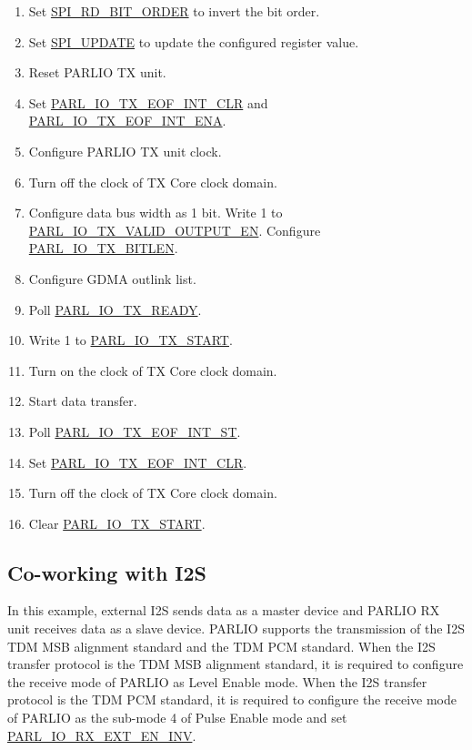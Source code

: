 \documentclass[main\_\_EN.tex]{subfiles}
\begin{document}
\begin{itemize}
\begin{enumerate}
        \item Set \hyperref[fielddesc:SPIRDBITORDER]{SPI\_RD\_BIT\_ORDER} to invert the bit order.
        \item Set \hyperref[fielddesc:SPIUPDATE]{SPI\_UPDATE} to update the configured register value.
        \item Reset PARLIO TX unit.
        \item Set \hyperref[fielddesc:PARLIOTXEOFINTCLR]{PARL\_IO\_TX\_EOF\_INT\_CLR} and \hyperref[fielddesc:PARLIOTXEOFINTENA]{PARL\_IO\_TX\_EOF\_INT\_ENA}.
        \item Configure PARLIO TX unit clock.
        \item Turn off the clock of TX Core clock domain.
        \item Configure data bus width as 1 bit. Write 1 to \hyperref[fielddesc:PARLIOTXVALIDOUTPUTEN]{PARL\_IO\_TX\_VALID\_OUTPUT\_EN}. Configure \hyperref[fielddesc:PARLIOTXBITLEN]{PARL\_IO\_TX\_BITLEN}.
        \item Configure GDMA outlink list.
        \item Poll \hyperref[fielddesc:PARLIOTXREADY]{PARL\_IO\_TX\_READY}.
        \item Write 1 to \hyperref[fielddesc:PARLIOTXSTART]{PARL\_IO\_TX\_START}.
        \item Turn on the clock of TX Core clock domain.
        \item Start data transfer.
        \item Poll \hyperref[fielddesc:PARLIOTXEOFINTST]{PARL\_IO\_TX\_EOF\_INT\_ST}.
        \item Set \hyperref[fielddesc:PARLIOTXEOFINTCLR]{PARL\_IO\_TX\_EOF\_INT\_CLR}.
        \item Turn off the clock of TX Core clock domain.
        \item Clear \hyperref[fielddesc:PARLIOTXSTART]{PARL\_IO\_TX\_START}.
    \end{enumerate}
\end{itemize}

\subsection{Co-working with I2S}

In this example, external I2S sends data as a master device and PARLIO RX unit receives data as a slave device. PARLIO supports the transmission of the I2S TDM MSB alignment standard and the TDM PCM standard. When the I2S transfer protocol is the TDM MSB alignment standard, it is required to configure the receive mode of PARLIO as Level Enable mode. When the I2S transfer protocol is the TDM PCM standard, it is required to configure the receive mode of PARLIO as the sub-mode 4 of Pulse Enable mode and set \hyperref[fielddesc:PARLIORXEXTENINV]{PARL\_IO\_RX\_EXT\_EN\_INV}.
\end{document}
